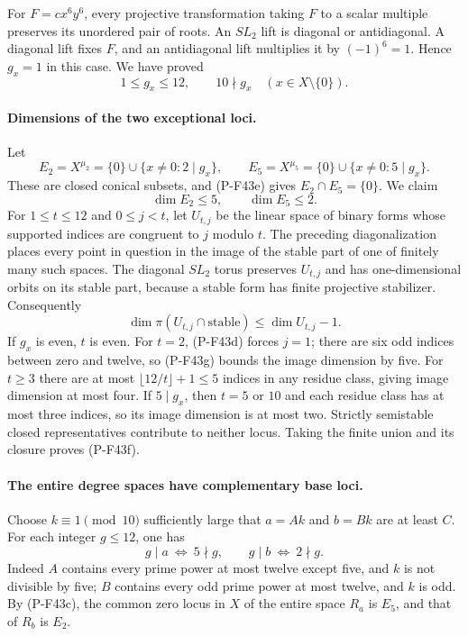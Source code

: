 For $F=cx^6y^6$, every projective transformation taking $F$
to a scalar multiple preserves its unordered pair of roots.
An $SL_2$ lift is diagonal or antidiagonal. A diagonal lift
fixes $F$, and an antidiagonal lift multiplies it by
$(-1)^6=1$. Hence $g_x=1$ in this case. We have proved
\[
              1\le g_x\le12,\qquad 10\nmid g_x
                    \quad(x\in X\setminus\{0\}).
 \tag{P-F43e}
\]

\paragraph{Dimensions of the two exceptional loci.}
Let
\[
 E_2=X^{\mu_2}=\{0\}\cup\{x\ne0:2\mid g_x\},
 \qquad
 E_5=X^{\mu_5}=\{0\}\cup\{x\ne0:5\mid g_x\}.
\]
These are closed conical subsets, and (P-F43e) gives
$E_2\cap E_5=\{0\}$. We claim
\[
                       \dim E_2\le5,\qquad\dim E_5\le2.
 \tag{P-F43f}
\]
For $1\le t\le12$ and $0\le j<t$, let $U_{t,j}$ be the
linear space of binary forms whose supported indices are
congruent to $j$ modulo $t$. The preceding diagonalization
places every point in question in the image of the stable
part of one of finitely many such spaces. The diagonal
$SL_2$ torus preserves $U_{t,j}$ and has one-dimensional
orbits on its stable part, because a stable form has finite
projective stabilizer. Consequently
\[
 \dim\pi(U_{t,j}\cap\mathrm{stable})
       \le \dim U_{t,j}-1.
 \tag{P-F43g}
\]
If $g_x$ is even, $t$ is even. For $t=2$, (P-F43d) forces
$j=1$; there are six odd indices between zero and twelve,
so (P-F43g) bounds the image dimension by five. For $t\ge3$
there are at most $\lfloor12/t\rfloor+1\le5$ indices in any
residue class, giving image dimension at most four. If
$5\mid g_x$, then $t=5$ or $10$ and each residue class has
at most three indices, so its image dimension is at most
two. Strictly semistable closed representatives contribute
to neither locus. Taking the finite union and its closure
proves (P-F43f).

\paragraph{The entire degree spaces have complementary base loci.}
Choose $k\equiv1\pmod {10}$ sufficiently large that
$a=Ak$ and $b=Bk$ are at least $C$. For each integer
$g\le12$, one has
\[
 g\mid a\ \Longleftrightarrow\ 5\nmid g,
 \qquad
 g\mid b\ \Longleftrightarrow\ 2\nmid g.
\]
Indeed $A$ contains every prime power at most twelve except
five, and $k$ is not divisible by five; $B$ contains every
odd prime power at most twelve, and $k$ is odd. By
(P-F43c), the common zero locus in $X$ of the entire space
$R_a$ is $E_5$, and that of $R_b$ is $E_2$.

